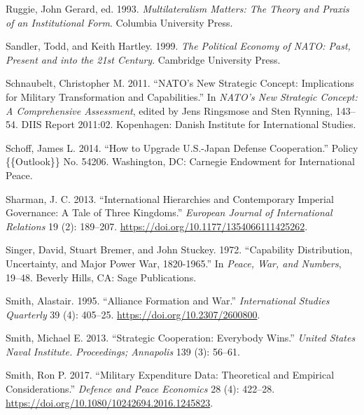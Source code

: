 \documentclass[
  12,
  letterpaper,
  DIV=11,
  numbers=noendperiod]{scrartcl}
\newlength{\cslhangindent}
\newlength{\cslentryspacingunit} %
\newenvironment{CSLReferences}[2] %
 {%
  \setlength{\parindent}{0pt}
  \ifodd #1
  \let\oldpar\par
  \def\par{\hangindent=\cslhangindent\oldpar}
  \fi
  \setlength{\parskip}{#2\cslentryspacingunit}
 }%
 {}
\begin{document}
\begin{CSLReferences}{1}{0}
\leavevmode{}%
Ruggie, John Gerard, ed. 1993. \emph{Multilateralism {Matters}: {The
Theory} and {Praxis} of an {Institutional Form}}. {Columbia University
Press}.

\leavevmode{}%
Sandler, Todd, and Keith Hartley. 1999. \emph{The {Political Economy} of
{NATO}: {Past}, {Present} and into the 21st {Century}}. {Cambridge
University Press}.

\leavevmode{}%
Schnaubelt, Christopher M. 2011. {``{NATO}'s {New Strategic Concept}:
{Implications} for {Military} {Transformation} and {Capabilities}.''} In
\emph{{NATO}'s New Strategic Concept: A Comprehensive Assessment},
edited by Jens Ringsmose and Sten Rynning, 143--54. {DIIS} Report
2011:02. {Kopenhagen}: {Danish Institute for International Studies}.

\leavevmode{}%
Schoff, James L. 2014. {``How to {Upgrade U}.{S}.-{Japan Defense
Cooperation}.''} Policy \{\{Outlook\}\} No. 54206. {Washington, DC}:
{Carnegie Endowment for International Peace}.

\leavevmode{}%
Sharman, J. C. 2013. {``International Hierarchies and Contemporary
Imperial Governance: {A} Tale of Three Kingdoms.''} \emph{European
Journal of International Relations} 19 (2): 189--207.
\url{https://doi.org/10.1177/1354066111425262}.

\leavevmode{}%
Singer, David, Stuart Bremer, and John Stuckey. 1972. {``Capability
{Distribution}, {Uncertainty}, and {Major Power War}, 1820-1965.''} In
\emph{Peace, War, and Numbers}, 19--48. {Beverly Hills, CA}: {Sage
Publications}.

\leavevmode{}%
Smith, Alastair. 1995. {``Alliance {Formation} and {War}.''}
\emph{International Studies Quarterly} 39 (4): 405--25.
\url{https://doi.org/10.2307/2600800}.

\leavevmode{}%
Smith, Michael E. 2013. {``Strategic {Cooperation}: {Everybody Wins}.''}
\emph{United States Naval Institute. Proceedings; Annapolis} 139 (3):
56--61.

\leavevmode{}%
Smith, Ron P. 2017. {``Military {Expenditure Data}: {Theoretical} and
{Empirical Considerations}.''} \emph{Defence and Peace Economics} 28
(4): 422--28. \url{https://doi.org/10.1080/10242694.2016.1245823}.


\end{CSLReferences}
\end{document}
